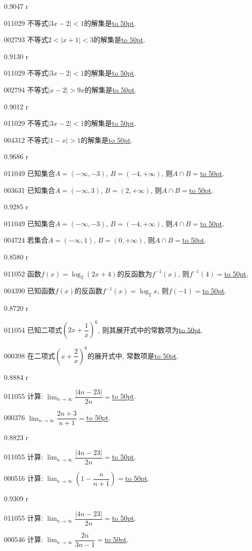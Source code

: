 \documentclass[10pt,a4paper]{article}
\newcommand{\blank}[1]{\underline{\hbox to #1pt{}}}
\begin{document}
0.9047 r

011029	不等式$|3x-2|<1$的解集是\blank{50}.

002793	不等式$2<|x+1|<3$的解集是\blank{50}.

0.9130 r

011029	不等式$|3x-2|<1$的解集是\blank{50}.

002794	不等式$|x-2|>9x$的解集是\blank{50}.

0.9012 r

011029	不等式$|3x-2|<1$的解集是\blank{50}.

004312	不等式$|1-x|>1$的解集是\blank{50}.

0.9686 r

011049	已知集合$A=(-\infty ,-3)$, $B=(-4,+\infty)$, 则$A\cap B=$\blank{50}.

003631	已知集合$A=(-\infty,3)$, $B=(2,+\infty)$, 则$A\cap B=$\blank{50}.

0.9285 r

011049	已知集合$A=(-\infty ,-3)$, $B=(-4,+\infty)$, 则$A\cap B=$\blank{50}.

004724	若集合$A=(-\infty ,1)$, $B=(0,+\infty)$, 则$A\cap B=$\blank{50}.

0.8580 r

011052	函数$f(x)=\log_2(2x+4)$的反函数为$f^{-1}(x)$, 则$f^{-1}(4)=$\blank{50}.

004390	已知函数$f(x)$的反函数$f^{-1}(x)=\log_2x$, 则$f(-1)=$\blank{50}.

0.8720 r

011054	已知二项式$(2x+\dfrac 1x)^6$, 则其展开式中的常数项为\blank{50}.

000398	在二项式$(x+\dfrac2x)^6$的展开式中, 常数项是\blank{50}.

0.8884 r

011055	计算: $\displaystyle\lim_{n\to \infty} \dfrac{|4n-23|}{2n}=$\blank{50}.

000376	$\displaystyle\lim_{n\to\infty}\dfrac{2n+3}{n+1}=$\blank{50}.

0.8823 r

011055	计算: $\displaystyle\lim_{n\to \infty} \dfrac{|4n-23|}{2n}=$\blank{50}.

000516	计算: $\displaystyle\lim_{n\to\infty}(1-\dfrac n{n+1})=$\blank{50}.

0.9309 r

011055	计算: $\displaystyle\lim_{n\to \infty} \dfrac{|4n-23|}{2n}=$\blank{50}.

000546	计算: $\displaystyle\lim_{n\to\infty}\dfrac{2n}{3n-1}=$\blank{50}.
\end{document}
